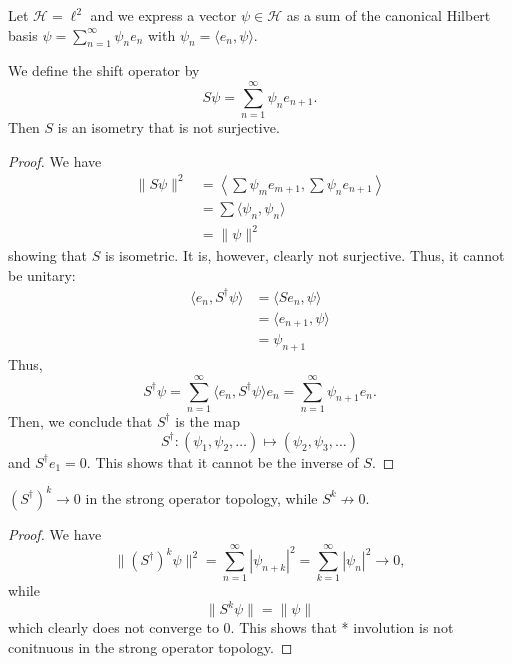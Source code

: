 \documentclass[twoside,symmetric, openany, 12pt]{./tuftebook}
\theoremstyle{definition}
\theoremstyle{definition}
\theoremstyle{definition}
\begin{document}
\begin{Example}
Let $\mathcal{H}=\ell^2$ and we express a vector $\psi\in \mathcal{H}$ as a sum of the canonical Hilbert basis $\psi=\sum_{n=1}^{\infty} \psi_n e_n$ with $\psi_n = \langle e_n, \psi\rangle$.

We define the shift operator by
\[
	S\psi = \sum_{n=1}^{\infty} \psi_n e_{n+1}
.\] 
Then $S$ is an isometry that is not surjective.
\end{Example}
\begin{proof}
	We have
	\begin{align*}
		\|S\psi\|^2 &= \left\langle \sum \psi_m e_{m+1}, \sum \psi_n e_{n+1}\right\rangle \\
			    &= \sum \langle \psi_n, \psi_n \rangle\\
			    &= \|\psi\|^2
	\end{align*}
	showing that $S$ is isometric. It is, however, clearly not surjective. Thus, it cannot be unitary:
	\begin{align*}
		\langle e_n, S^\dagger \psi\rangle &= \langle S e_n, \psi\rangle\\
						   &= \langle e_{n+1}, \psi\rangle\\
						   &= \psi_{n+1}
	\end{align*}
	Thus, 
	\[
		S^\dagger \psi = \sum_{n=1}^{\infty} \langle e_n, S^\dagger \psi\rangle e_n = \sum_{n=1}^{\infty} \psi_{n+1} e_n
	.\] 
	Then, we conclude that $S^\dagger$ is the map
	\[
	S^\dagger: (\psi_1, \psi_2, \dots )\mapsto (\psi_2, \psi_3, \dots)
	\]
	and $S^\dagger e_1 = 0$. This shows that it cannot be the inverse of $S$.
\end{proof}
\begin{Proposition}
	$(S^\dagger)^k\to 0$ in the strong operator topology, while $S^k\not\to 0$.
\end{Proposition}
\begin{proof}
	We have
	\[
		\|(S^\dagger)^k \psi\|^2 = \sum_{n=1}^{\infty} |\psi_{n+k}|^2 = \sum_{k=1}^\infty |\psi_n|^2 \to 0
	,\]
	while
	\[
	\|S^k \psi\|= \|\psi\|
\]
which clearly does not converge to 0. This shows that * involution is not conitnuous in the strong operator topology.
\end{proof}
\end{document}
